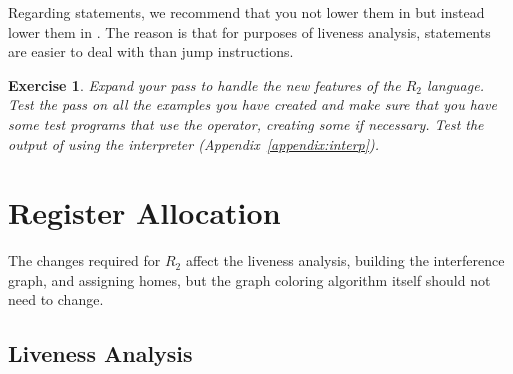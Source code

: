 \documentclass[11pt]{book}
\newtheorem{exercise}[theorem]{Exercise}
\begin{document}
% 
% 

Regarding  statements, we recommend that you not lower them in
 but instead lower them in
.  The reason is that for purposes of
liveness analysis,  statements are easier to deal with than
jump instructions.

\begin{exercise}\normalfont
Expand your  pass to handle the new features
of the $R_2$ language. Test the pass on all the examples you have
created and make sure that you have some test programs that use the
 operator, creating some if necessary. Test the output of
 using the  interpreter
(Appendix~\ref{appendix:interp}).
\end{exercise}

\section{Register Allocation}
\label{sec:register-allocation-r2}

The changes required for $R_2$ affect the liveness analysis, building
the interference graph, and assigning homes, but the graph coloring
algorithm itself should not need to change.

\subsection{Liveness Analysis}
\label{sec:liveness-analysis-r2}
\end{document}
